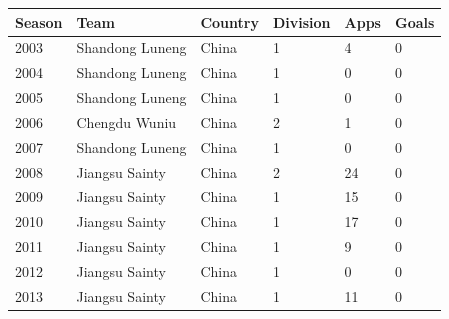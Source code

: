 \documentclass{article}
\begin{document}
\begin{tabular}{llllll}
\toprule
Season & Team & Country & Division & Apps & Goals \\
\midrule
2003 & Shandong Luneng & China & 1 & 4 & 0 \\
2004 & Shandong Luneng & China & 1 & 0 & 0 \\
2005 & Shandong Luneng & China & 1 & 0 & 0 \\
2006 & Chengdu Wuniu & China & 2 & 1 & 0 \\
2007 & Shandong Luneng & China & 1 & 0 & 0 \\
2008 & Jiangsu Sainty & China & 2 & 24 & 0 \\
2009 & Jiangsu Sainty & China & 1 & 15 & 0 \\
2010 & Jiangsu Sainty & China & 1 & 17 & 0 \\
2011 & Jiangsu Sainty & China & 1 & 9 & 0 \\
2012 & Jiangsu Sainty & China & 1 & 0 & 0 \\
2013 & Jiangsu Sainty & China & 1 & 11 & 0 \\
\bottomrule
\end{tabular}
\end{document}
